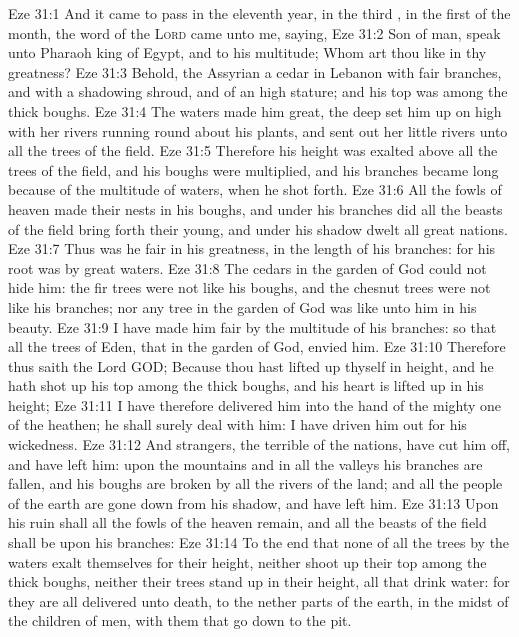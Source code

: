 \vs Eze 31:1 And it came to pass in the eleventh year, in the third , in the first  of the month,  the word of the \textsc{Lord} came unto me, saying,
\vs Eze 31:2 Son of man, speak unto Pharaoh king of Egypt, and to his multitude; Whom art thou like in thy greatness?
\vs Eze 31:3 Behold, the Assyrian  a cedar in Lebanon with fair branches, and with a shadowing shroud, and of an high stature; and his top was among the thick boughs.
\vs Eze 31:4 The waters made him great, the deep set him up on high with her rivers running round about his plants, and sent out her little rivers unto all the trees of the field.
\vs Eze 31:5 Therefore his height was exalted above all the trees of the field, and his boughs were multiplied, and his branches became long because of the multitude of waters, when he shot forth.
\vs Eze 31:6 All the fowls of heaven made their nests in his boughs, and under his branches did all the beasts of the field bring forth their young, and under his shadow dwelt all great nations.
\vs Eze 31:7 Thus was he fair in his greatness, in the length of his branches: for his root was by great waters.
\vs Eze 31:8 The cedars in the garden of God could not hide him: the fir trees were not like his boughs, and the chesnut trees were not like his branches; nor any tree in the garden of God was like unto him in his beauty.
\vs Eze 31:9 I have made him fair by the multitude of his branches: so that all the trees of Eden, that  in the garden of God, envied him.
\vs Eze 31:10 Therefore thus saith the Lord GOD; Because thou hast lifted up thyself in height, and he hath shot up his top among the thick boughs, and his heart is lifted up in his height;
\vs Eze 31:11 I have therefore delivered him into the hand of the mighty one of the heathen; he shall surely deal with him: I have driven him out for his wickedness.
\vs Eze 31:12 And strangers, the terrible of the nations, have cut him off, and have left him: upon the mountains and in all the valleys his branches are fallen, and his boughs are broken by all the rivers of the land; and all the people of the earth are gone down from his shadow, and have left him.
\vs Eze 31:13 Upon his ruin shall all the fowls of the heaven remain, and all the beasts of the field shall be upon his branches:
\vs Eze 31:14 To the end that none of all the trees by the waters exalt themselves for their height, neither shoot up their top among the thick boughs, neither their trees stand up in their height, all that drink water: for they are all delivered unto death, to the nether parts of the earth, in the midst of the children of men, with them that go down to the pit.
